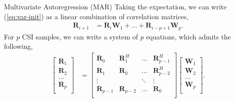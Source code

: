 \documentclass{beamer}
\begin{document}
  \begin{frame}{Multivariate Autoregression (MAR)}
    Taking the expectation, we can write (\ref{eq:var-init})
    as a linear combination of correlation matrices,
    \begin{align*}
    \mathbf R_{i+1} &= \mathbf{R}_{i} \mathbf W_{1} + \dots + \mathbf{R}_{i-p+1} \mathbf W_{p}. 
    \end{align*}
    For $p$ CSI samples, we can write a system of $p$
    equations, which admits the following,
    \begin{align*}
      \begin{bmatrix}
        \mathbf R_{1} \\ \mathbf R_{2} \\ \dots \\ \mathbf R_{p} \\
      \end{bmatrix}
      &= 
      \begin{bmatrix}
        \mathbf R_{0} & \mathbf R_1^H & \dots  & \mathbf R_{p-1}^H \\
        \mathbf R_{1} & \mathbf R_0   & \dots  & \mathbf R_{p-2}^H \\
        \vdots      &         & \ddots & \vdots \\
        \mathbf R_{p-1} & \mathbf R_{p-2}   & \dots  & \mathbf R_{0} \\
      \end{bmatrix}
      \begin{bmatrix}
        \mathbf W_{1} \\ \mathbf W_{2} \\ \dots \\ \mathbf W_{p} \\
      \end{bmatrix}.
    \end{align*}
  \end{frame}
\end{document}
